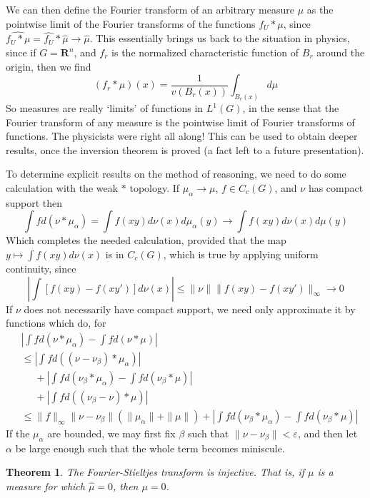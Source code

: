 \documentclass{article}
\theoremstyle{plain}
\newtheorem{theorem}{Theorem}
\theoremstyle{definition}
\begin{document}
We can then define the Fourier transform of an arbitrary measure $\mu$ as the pointwise limit of the Fourier transforms of the functions $f_U * \mu$, since $\widehat{f_U * \mu} = \widehat{f_U} * \widehat{\mu} \to \widehat{\mu}$. This essentially brings us back to the situation in physics, since if $G = \mathbf{R}^n$, and $f_r$ is the normalized characteristic function of $B_r$ around the origin, then we find
%
\[ (f_r * \mu)(x) = \frac{1}{v(B_r(x))} \int_{B_r(x)} d\mu \]
%
So measures are really `limits' of functions in $L^1(G)$, in the sense that the Fourier transform of any measure is the pointwise limit of Fourier transforms of functions. The physicists were right all along! This can be used to obtain deeper results, once the inversion theorem is proved (a fact left to a future presentation).

To determine explicit results on the method of reasoning, we need to do some calculation with the weak $*$ topology. If $\mu_\alpha \to \mu$, $f \in C_c(G)$, and $\nu$ has compact support then
%
\[ \int f d(\nu * \mu_\alpha) = \int f(xy) d\nu(x) d\mu_\alpha(y) \to \int f(xy) d\nu(x) d\mu(y) \]
%
Which completes the needed calculation, provided that the map $y \mapsto \int f(xy) d\nu(x)$ is in $C_c(G)$, which is true by applying uniform continuity, since
%
\[ \left| \int [f(xy) - f(xy')] d\nu(x) \right| \leq \| \nu \| \| f(xy) - f(xy') \|_\infty \to 0 \]
%
If $\nu$ does not necessarily have compact support, we need only approximate it by functions which do, for
%
\begin{align*}
        &\left| \int f d(\nu * \mu_\alpha) - \int f d(\nu * \mu) \right|\\
        &\leq \left| \int f d((\nu - \nu_\beta) * \mu_\alpha) \right|\\
        &\ \ \ \ \ \ + \left| \int f d (\nu_\beta * \mu_\alpha) - \int f d (\nu_\beta * \mu) \right|\\
        &\ \ \ \ \ \ + \left| \int fd((\nu_\beta - \nu) * \mu) \right|\\
        &\leq \| f \|_\infty \| \nu - \nu_\beta \| \left( \| \mu_\alpha \| + \| \mu \| \right) + \left| \int f d (\nu_\beta * \mu_\alpha) - \int f d (\nu_\beta * \mu) \right|
\end{align*}
    If the $\mu_\alpha$ are bounded, we may first fix $\beta$ such that $\| \nu - \nu_\beta \| < \varepsilon$, and then let $\alpha$ be large enough such that the whole term becomes miniscule.

\begin{theorem}
    The Fourier-Stieltjes transform is injective. That is, if $\mu$ is a measure for which $\widehat{\mu} = 0$, then $\mu = 0$.
\end{theorem}
\end{document}
